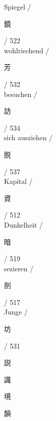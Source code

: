  \vspace{0.2cm}Spiegel / {\Huge \begin{CJK}{UTF8}{min} 鏡 \end{CJK}} / 522\\
 \vspace{0.2cm}wohlriechend / {\Huge \begin{CJK}{UTF8}{min} 芳 \end{CJK}} / 532\\
 \vspace{0.2cm}besuchen / {\Huge \begin{CJK}{UTF8}{min} 訪 \end{CJK}} / 534\\
 \vspace{0.2cm}sich ausziehen / {\Huge \begin{CJK}{UTF8}{min} 脱 \end{CJK}} / 537\\
 \vspace{0.2cm}Kapital / {\Huge \begin{CJK}{UTF8}{min} 資 \end{CJK}} / 512\\
 \vspace{0.2cm}Dunkelheit / {\Huge \begin{CJK}{UTF8}{min} 暗 \end{CJK}} / 519\\
 \vspace{0.2cm}sezieren / {\Huge \begin{CJK}{UTF8}{min} 剖 \end{CJK}} / 517\\
 \vspace{0.2cm}Junge / {\Huge \begin{CJK}{UTF8}{min} 坊 \end{CJK}} / 531\\
\cleardoublepage
{\Huge \begin{CJK}{UTF8}{min} 説\end{CJK}}\hspace{0.1cm}
{\Huge \begin{CJK}{UTF8}{min} 識\end{CJK}}\hspace{0.1cm}
{\Huge \begin{CJK}{UTF8}{min} 境\end{CJK}}\hspace{0.1cm}
{\Huge \begin{CJK}{UTF8}{min} 韻\end{CJK}}\hspace{0.1cm}
